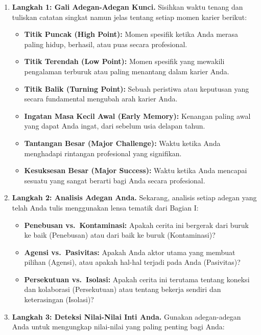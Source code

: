 \documentclass[
  letterpaper,
  DIV=11,
  numbers=noendperiod]{scrreprt}
\begin{document}
\begin{enumerate}
\def\labelenumi{\arabic{enumi}.}
\item
  \textbf{Langkah 1: Gali Adegan-Adegan Kunci.} Sisihkan waktu tenang
  dan tuliskan catatan singkat namun jelas tentang setiap momen karier
  berikut:

  \begin{itemize}
  \item
    \textbf{Titik Puncak (High Point):} Momen spesifik ketika Anda
    merasa paling hidup, berhasil, atau puas secara profesional.
  \item
    \textbf{Titik Terendah (Low Point):} Momen spesifik yang mewakili
    pengalaman terburuk atau paling menantang dalam karier Anda.
  \item
    \textbf{Titik Balik (Turning Point):} Sebuah peristiwa atau
    keputusan yang secara fundamental mengubah arah karier Anda.
  \item
    \textbf{Ingatan Masa Kecil Awal (Early Memory):} Kenangan paling
    awal yang dapat Anda ingat, dari sebelum usia delapan tahun.
  \item
    \textbf{Tantangan Besar (Major Challenge):} Waktu ketika Anda
    menghadapi rintangan profesional yang signifikan.
  \item
    \textbf{Kesuksesan Besar (Major Success):} Waktu ketika Anda
    mencapai sesuatu yang sangat berarti bagi Anda secara profesional.
  \end{itemize}
\item
  \textbf{Langkah 2: Analisis Adegan Anda.} Sekarang, analisis setiap
  adegan yang telah Anda tulis menggunakan lensa tematik dari Bagian I:

  \begin{itemize}
  \item
    \textbf{Penebusan vs.~Kontaminasi:} Apakah cerita ini bergerak dari
    buruk ke baik (Penebusan) atau dari baik ke buruk (Kontaminasi)?
  \item
    \textbf{Agensi vs.~Pasivitas:} Apakah Anda aktor utama yang membuat
    pilihan (Agensi), atau apakah hal-hal terjadi pada Anda (Pasivitas)?
  \item
    \textbf{Persekutuan vs.~Isolasi:} Apakah cerita ini terutama tentang
    koneksi dan kolaborasi (Persekutuan) atau tentang bekerja sendiri
    dan keterasingan (Isolasi)?
  \end{itemize}
\item
  \textbf{Langkah 3: Deteksi Nilai-Nilai Inti Anda.} Gunakan
  adegan-adegan Anda untuk mengungkap nilai-nilai yang paling penting
  bagi Anda:


\end{enumerate}
\end{document}
